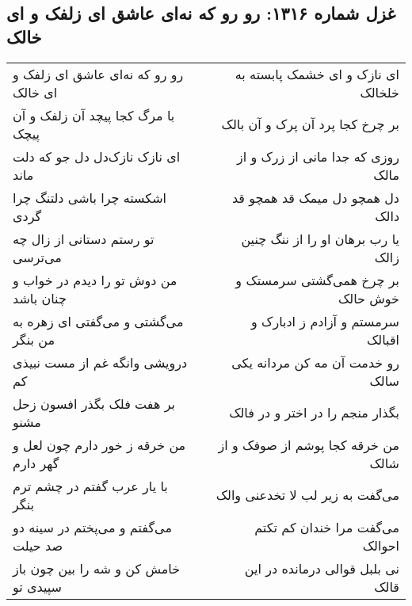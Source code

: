 \begin{center}
\section*{غزل شماره ۱۳۱۶: رو رو که نه‌ای عاشق ای زلفک و ای خالک}
\label{sec:1316}
\begin{longtable}{l p{0.5cm} r}
رو رو که نه‌ای عاشق ای زلفک و ای خالک
&&
ای نازک و ای خشمک پابسته به خلخالک
\\
با مرگ کجا پیچد آن زلفک و آن پیچک
&&
بر چرخ کجا پرد آن پرک و آن بالک
\\
ای نازک نازک‌دل دل جو که دلت ماند
&&
روزی که جدا مانی از زرک و از مالک
\\
اشکسته چرا باشی دلتنگ چرا گردی
&&
دل همچو دل میمک قد همچو قد دالک
\\
تو رستم دستانی از زال چه می‌ترسی
&&
یا رب برهان او را از ننگ چنین زالک
\\
من دوش تو را دیدم در خواب و چنان باشد
&&
بر چرخ همی‌گشتی سرمستک و خوش حالک
\\
می‌گشتی و می‌گفتی ای زهره به من بنگر
&&
سرمستم و آزادم ز ادبارک و اقبالک
\\
درویشی وانگه غم از مست نبیذی کم
&&
رو خدمت آن مه کن مردانه یکی سالک
\\
بر هفت فلک بگذر افسون زحل مشنو
&&
بگذار منجم را در اختر و در فالک
\\
من خرقه ز خور دارم چون لعل و گهر دارم
&&
من خرقه کجا پوشم از صوفک و از شالک
\\
با یار عرب گفتم در چشم ترم بنگر
&&
می‌گفت به زیر لب لا تخدعنی والک
\\
می‌گفتم و می‌پختم در سینه دو صد حیلت
&&
می‌گفت مرا خندان کم تکتم احوالک
\\
خامش کن و شه را بین چون باز سپیدی تو
&&
نی بلبل قوالی درمانده در این قالک
\\
\end{longtable}
\end{center}
